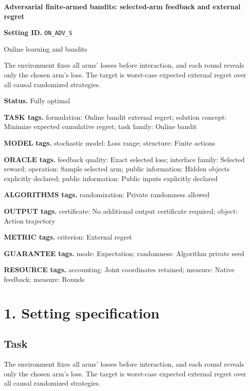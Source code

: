 \documentclass[10pt,a4paper]{article}
\begin{document}
\raggedright

{\LARGE\bfseries\sffamily\color{AtlasNavy} Adversarial finite-armed bandits: selected-arm feedback and external regret\par}\vspace{5pt}
\textbf{Setting ID.} \texttt{ON\_\allowbreak{}ADV\_\allowbreak{}S}

Online learning and bandits

The environment fixes all arms' losses before interaction, and each round reveals only the chosen arm's loss. The target is worst-case expected external regret over all causal randomized strategies.

\textbf{Status.} Fully optimal

\textbf{TASK tags.} formulation: Online bandit external regret; solution concept: Minimize expected cumulative regret; task family: Online bandit

\textbf{MODEL tags.} stochastic model: Loss range; structure: Finite actions

\textbf{ORACLE tags.} feedback quality: Exact selected loss; interface family: Selected reward; operation: Sample selected arm; public information: Hidden objects explicitly declared; public information: Public inputs explicitly declared

\textbf{ALGORITHMS tags.} randomization: Private randomness allowed

\textbf{OUTPUT tags.} certificate: No additional output certificate required; object: Action trajectory

\textbf{METRIC tags.} criterion: External regret

\textbf{GUARANTEE tags.} mode: Expectation; randomness: Algorithm private seed

\textbf{RESOURCE tags.} accounting: Joint coordinates retained; measure: Native feedback; measure: Rounds

\section{1. Setting specification}
\subsection{Task}
The environment fixes all arms' losses before interaction, and each round reveals only the chosen arm's loss. The target is worst-case expected external regret over all causal randomized strategies.
\end{document}
